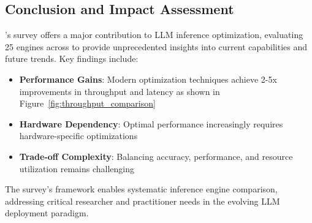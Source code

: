\documentclass[12pt,a4paper]{article}
\begin{document}
\subsection{Conclusion and Impact Assessment}

\cite{park2025}'s survey offers a major contribution to LLM inference optimization, evaluating 25 engines across to provide unprecedented insights into current capabilities and future trends. Key findings include:

\begin{itemize}
    \item \textbf{Performance Gains}: Modern optimization techniques achieve 2-5x improvements in throughput and latency as shown in Figure~\ref{fig:throughput_comparison}
    
    \item \textbf{Hardware Dependency}: Optimal performance increasingly requires hardware-specific optimizations
    \item \textbf{Trade-off Complexity}: Balancing accuracy, performance, and resource utilization remains challenging
\end{itemize}

The survey's framework enables systematic inference engine comparison, addressing critical researcher and practitioner needs in the evolving LLM deployment paradigm.
\end{document}
